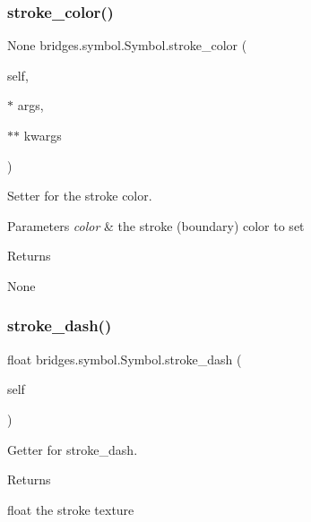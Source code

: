 \subsubsection{\texorpdfstring{stroke\_color()}{stroke\_color()}\hspace{0.1cm}{\footnotesize\ttfamily [2/2]}}
{\footnotesize\ttfamily  None bridges.\+symbol.\+Symbol.\+stroke\+\_\+color (\begin{DoxyParamCaption}\item[{}]{self,  }\item[{$\ast$}]{args,  }\item[{$\ast$$\ast$}]{kwargs }\end{DoxyParamCaption})}



Setter for the stroke color. 


\begin{DoxyParams}{Parameters}
{\em color} & the stroke (boundary) color to set \\
\hline
\end{DoxyParams}
\begin{DoxyReturn}{Returns}


None 
\end{DoxyReturn}
\mbox{\label{classbridges_1_1symbol_1_1_symbol_acaf6ea8c82bfaef336c742d447bae380}} 
\subsubsection{\texorpdfstring{stroke\_dash()}{stroke\_dash()}\hspace{0.1cm}{\footnotesize\ttfamily [1/2]}}
{\footnotesize\ttfamily  float bridges.\+symbol.\+Symbol.\+stroke\+\_\+dash (\begin{DoxyParamCaption}\item[{}]{self }\end{DoxyParamCaption})}



Getter for stroke\+\_\+dash. 

\begin{DoxyReturn}{Returns}


float the stroke texture 
\end{DoxyReturn}
\mbox{\label{classbridges_1_1symbol_1_1_symbol_a78470b4fe73aea2cf7f5b7ad02eb2776}} 
